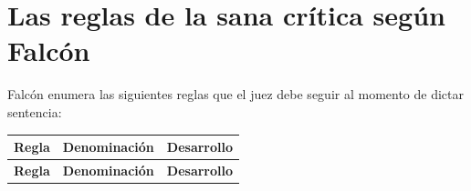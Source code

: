 \documentclass[12pt,oneside]{book}
\begin{document}
\section{Las reglas de la sana crítica según Falcón}

Falcón enumera las siguientes reglas que el juez debe seguir al momento de dictar sentencia:

\begin{longtable}{>{\raggedright\arraybackslash}p{1.6cm} >{\raggedright\arraybackslash}p{3.8cm} >{\raggedright\arraybackslash}p{7.6cm}}
\toprule
\textbf{Regla} & \textbf{Denominación} & \textbf{Desarrollo} \\
\midrule
\endfirsthead
\toprule
\textbf{Regla} & \textbf{Denominación} & \textbf{Desarrollo} \\
\midrule
\endhead


\end{longtable}
\end{document}
